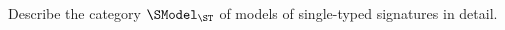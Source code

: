 \begin{exercise}
Describe the category \(\SModel_{\ST}\) of models of single-typed signatures in detail.
\end{exercise}